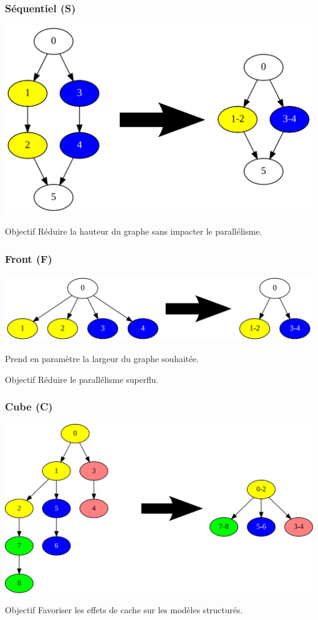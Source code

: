 \documentclass{beamer}
\begin{document}
\begin{frame}
  \frametitle{Séquentiel (S)}

  \centerline{\includegraphics[width=0.80\linewidth]{algo_S}}

  \begin{block}{Objectif}
    Réduire la hauteur du graphe sans impacter le parallélisme.
  \end{block}
\end{frame}



\begin{frame}
  \frametitle{Front (F)}

  \centerline{\includegraphics[width=0.80\linewidth]{algo_F2}}

  \bigskip
  \bigskip

  Prend en paramètre la largeur du graphe souhaitée.

  \bigskip

  \begin{block}{Objectif}
    Réduire le parallélisme superflu.
  \end{block}
\end{frame}


\begin{frame}
  \frametitle{Cube (C)}

  \centerline{\includegraphics[width=0.80\linewidth]{algo_3}}

  \begin{block}{Objectif}
    Favoriser les effets de cache sur les modèles structurés.
  \end{block}
\end{frame}
\end{document}
